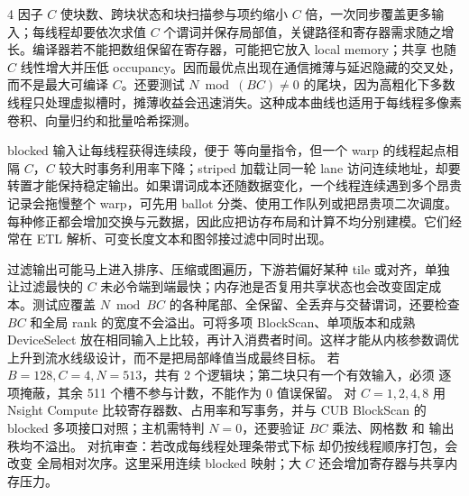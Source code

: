 \begin{solutionexercise}{4}
因子 $C$ 使块数、跨块状态和块扫描参与项约缩小 $C$ 倍，一次同步覆盖更多输入；每线程却要依次求值 $C$ 个谓词并保存局部值，关键路径和寄存器需求随之增长。编译器若不能把数组保留在寄存器，可能把它放入 local memory；共享  也随 $C$ 线性增大并压低 occupancy。因而最优点出现在通信摊薄与延迟隐藏的交叉处，而不是最大可编译 $C$。还要测试 $N\bmod (BC)\ne0$ 的尾块，因为高粗化下多数线程只处理虚拟槽时，摊薄收益会迅速消失。这种成本曲线也适用于每线程多像素卷积、向量归约和批量哈希探测。

blocked 输入让每线程获得连续段，便于  等向量指令，但一个 warp 的线程起点相隔 $C$，$C$ 较大时事务利用率下降；striped 加载让同一轮 lane 访问连续地址，却要转置才能保持稳定输出。如果谓词成本还随数据变化，一个线程连续遇到多个昂贵记录会拖慢整个 warp，可先用 ballot 分类、使用工作队列或把昂贵项二次调度。每种修正都会增加交换与元数据，因此应把访存布局和计算不均分别建模。它们经常在 ETL 解析、可变长度文本和图邻接过滤中同时出现。

过滤输出可能马上进入排序、压缩或图遍历，下游若偏好某种 tile 或对齐，单独让过滤最快的 $C$ 未必令端到端最快；内存池是否复用共享状态也会改变固定成本。测试应覆盖 $N\bmod BC$ 的各种尾部、全保留、全丢弃与交替谓词，还要检查 $BC$ 和全局 rank 的宽度不会溢出。可将多项 BlockScan、单项版本和成熟 DeviceSelect 放在相同输入上比较，再计入消费者时间。这样才能从内核参数调优上升到流水线级设计，而不是把局部峰值当成最终目标。
\variantheading 若 $B=128,C=4,N=513$，共有 2 个逻辑块；第二块只有一个有效输入，必须
逐项掩蔽，其余 511 个槽不参与计数，不能作为 0 值误保留。
\practiceheading 对 $C=1,2,4,8$ 用 Nsight Compute 比较寄存器数、占用率和写事务，并与
CUB BlockScan 的 blocked 多项接口对照；主机需特判 $N=0$，还要验证 $BC$ 乘法、网格数
和  输出秩均不溢出。
对抗审查：若改成每线程处理条带式下标  却仍按线程顺序打包，会改变
全局相对次序。这里采用连续 blocked 映射；大 $C$ 还会增加寄存器与共享内存压力。
\end{solutionexercise}

